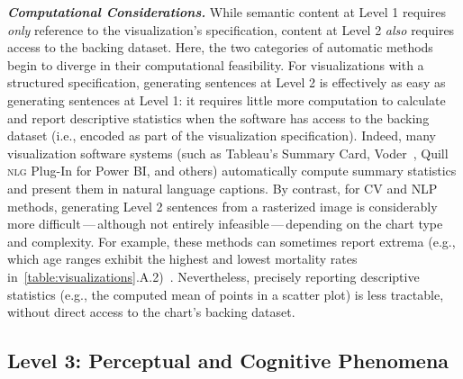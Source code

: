 \textbf{\emph{Computational Considerations.}}
While semantic content at Level 1 requires \emph{only} reference to the visualization's specification, content at Level 2 \emph{also} requires access to the backing dataset.
Here, the two categories of automatic methods begin to diverge in their computational feasibility.
For visualizations with a structured specification, generating sentences at Level 2 is effectively as easy as generating sentences at Level 1: it requires little more computation to calculate and report descriptive statistics when the software has access to the backing dataset (i.e., encoded as part of the visualization specification).
Indeed, many visualization software systems (such as Tableau's Summary Card, Voder~\cite{srinivasan_augmenting_2019}, Quill \textsc{nlg} Plug-In for Power BI, and others) automatically compute summary statistics and present them in natural language captions.
By contrast, for \ac{CV} and \ac{NLP} methods, generating Level 2 sentences from a rasterized image is considerably more difficult\,---\,although not entirely infeasible\,---\,depending on the chart type and complexity.
For example, these methods can sometimes report extrema (e.g., which age ranges exhibit the highest and lowest mortality rates in~\ref{table:visualizations}.A.2)~\cite{obeid_chart--text_2020, demir_generating_2008}.
Nevertheless, precisely reporting descriptive statistics (e.g., the computed mean of points in a scatter plot) is less tractable, without direct access to the chart's backing dataset.




\subsection{Level 3: Perceptual and Cognitive Phenomena}

